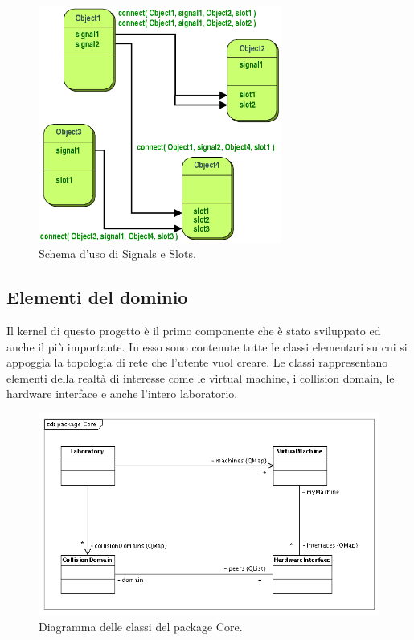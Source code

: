 \begin{figure}[!htb]
	\centering
	\includegraphics[width=8cm]{images/signals_slots.png}
	\caption{Schema d'uso di Signals e Slots.}
	\label{figura:qt_signals_slots}
\end{figure}

\subsection{Elementi del dominio}
Il kernel di questo progetto è il primo componente che è stato sviluppato ed anche il più importante. In esso sono contenute tutte le classi elementari su cui si appoggia la topologia di rete che l'utente vuol creare. Le classi rappresentano elementi della realtà di interesse come le virtual machine, i collision domain, le hardware interface e anche l'intero laboratorio.

\begin{figure}[!htb]
	\centering
	\includegraphics[width=12cm]{images/uml_package_core.png}
	\caption{Diagramma delle classi del package Core.}
	\label{figura:uml_package_core}
\end{figure}

